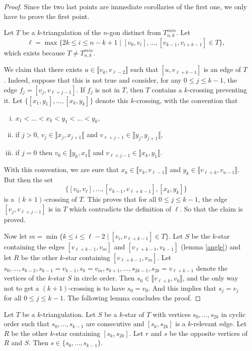 \documentclass[12pt]{amsart}
\begin{document}
\begin{proof}
Since the two last points are immediate corollaries of the first one, we only have to prove the first point.

Let $T$ be a $k$-triangulation of the $n$-gon distinct from $T_{n,k}^{min}$. Let
$$\ell=\max\{2k\le i\le n-k+1\;|\;[v_0,v_i],\ldots,[v_{k-1},v_{i+k-1}]\in T\},$$
which exists because $T\ne T_{n,k}^{min}$.

We claim that there exists $u\in\llbracket v_k, v_{\ell-2}\rrbracket$ such that $[u,v_{\ell+k-1}]$ is an edge of $T$. Indeed, suppose that this is not true and consider, for any $0\le j\le k-1$, the edge $f_j=[v_j,v_{\ell+j-1}]$. If $f_j$ is not in $T$, then $T$ contains a $k$-crossing preventing it.
Let $\{[x_1,y_1],\ldots,[x_k,y_k]\}$ denote this $k$-crossing, with the convention that
\begin{enumerate}[(i)]
\item $x_1<\ldots<x_k<y_1<\ldots<y_k$,
\item if $j>0$, $v_j\in\rrbracket x_j,x_{j+1}\llbracket$ and $v_{\ell+j-1}\in\rrbracket y_j,y_{j+1}\llbracket$,
\item if $j=0$ then $v_0\in\rrbracket y_k,x_1\llbracket$ and $v_{\ell+j-1}\in\rrbracket x_k,y_1\llbracket$.
\end{enumerate}
With this convention, we are sure that $x_k\in\llbracket v_k,v_{\ell-1}\rrbracket$ and $y_k\in\llbracket v_{\ell+k},v_{n-1}\rrbracket$. But then the set
$$\{[v_0,v_\ell],\ldots,[v_{k-1},v_{\ell+k-1}],[x_k,y_k]\}$$
is a $(k+1)$-crossing of $T$. This proves that for all $0\le j\le k-1$, the edge $[v_j,v_{\ell+j-1}]$ is in $T$ which contradicts the definition of $\ell$. So that the claim is proved.

Now let $m=\min\{k\le i\le \ell-2\;|\; [v_i,v_{\ell+k-1}]\in T\}$. Let $S$ be the $k$-star containing the edges $[v_{\ell+k-1},v_m]$ and $[v_{\ell+k-1},v_{k-1}]$ (lemma \ref{angle}) and let $R$ be the other $k$-star containing $[v_{\ell+k-1},v_m]$. Let $s_0, \ldots,s_{k-2},s_{k-1}=v_{k-1},s_k=v_m,s_{k+1},\ldots,s_{2k-1},s_{2k}=v_{\ell+k-1}$ denote the vertices of the $k$-star $S$ in circle order. Then $s_0\in\llbracket v_{\ell+k}, v_0\rrbracket$, and the only way not to get a $(k+1)$-crossing is to have $s_0=v_0$. And this implies that $s_j=v_j$ for all $0\le j\le k-1$. The following lemma concludes the proof.
\end{proof}

\begin{lemma}
Let $T$ be a $k$-triangulation. Let $S$ be a $k$-star of $T$ with vertices $s_0,\ldots, s_{2k}$ in cyclic order such that $s_0,\ldots,s_{k-1}$ are consecutive and $[s_k,s_{2k}]$ is a $k$-relevant edge. Let $R$ be the other $k$-star containing $[s_k,s_{2k}]$. Let $r$ and $s$ be the opposite vertices of $R$ and $S$. Then $s\in\{s_0,\ldots,s_{k-1}\}$.
\end{lemma}
\end{document}
